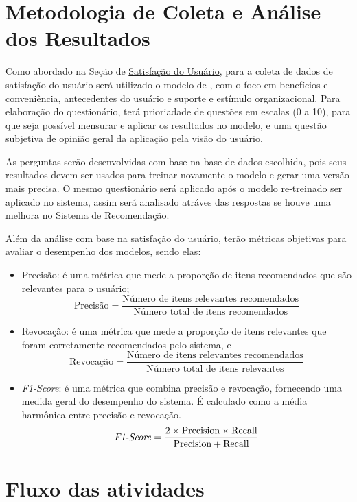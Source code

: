 \section{Metodologia de Coleta e Análise dos Resultados}\label{sec:meteanresul}

Como abordado na Seção de \hyperref[sec:expus]{Satisfação do Usuário}, para a coleta de dados de satisfação do usuário 
será utilizado o modelo de , com o foco em benefícios e conveniência, antecedentes do usuário
e suporte e estímulo organizacional. Para elaboração do questionário, terá prioriadade de questões em escalas (0 a 10), para
que seja possível mensurar e aplicar os resultados no modelo, e uma questão subjetiva de opinião geral da aplicação pela
visão do usuário.

As perguntas serão desenvolvidas com base na base de dados escolhida, pois seus resultados devem ser usados para treinar novamente
o modelo e gerar uma versão mais precisa. O mesmo questionário será aplicado após o modelo re-treinado ser aplicado no sistema, assim
será analisado atráves das respostas se houve uma melhora no Sistema de Recomendação.

Além da análise com base na satisfação do usuário, terão métricas objetivas para avaliar o desempenho dos modelos, sendo elas:
\begin{itemize}
    \item Precisão: é uma métrica que mede a proporção de itens recomendados que são relevantes para o usuário;
    \[
    \text{Precisão} = \frac{\text{Número de itens relevantes recomendados}}{\text{Número total de itens recomendados}}
    \]
    \item Revocação: é uma métrica que mede a proporção de itens relevantes que foram corretamente recomendados pelo sistema, e
    \[
    \text{Revocação} = \frac{\text{Número de itens relevantes recomendados}}{\text{Número total de itens relevantes}}
    \]
    \item \textit{F1-Score}: é uma métrica que combina precisão e revocação, fornecendo uma medida geral do desempenho do 
    sistema. É calculado como a média harmônica entre precisão e revocação.
    \[
    \text{\textit{F1-Score}} = \frac{2 \times \text{Precision} \times \text{Recall}}{\text{Precision} + \text{Recall}}
    \]
\end{itemize}

\section{Fluxo das atividades}\label{sec:fluxoatv}

